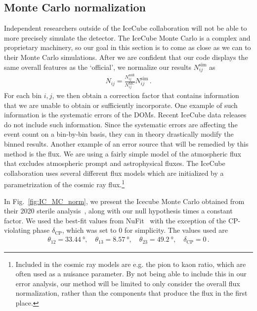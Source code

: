 \subsection*{Monte Carlo normalization}
Independent researchers outside of the IceCube collaboration will not be able to more precisely
simulate the detector. The IceCube Monte Carlo is a complex and proprietary machinery, so our goal in this 
section is to come as close as we can to their Monte Carlo simulations. After we are confident that 
our code displays the same overall features as the `official', we normalize our results $N_{ij}^\text{sim}$ as 
\begin{align}\label{eq:MC_norm}
    N_{ij} = \frac{N_{ij}^\text{null}}{N_{ij}^\text{MC}} N_{ij}^\text{sim}\,.
\end{align}
For each bin $i,j$, we then obtain a correction factor that contains information that we are unable
to obtain or sufficiently incorporate. One example of such information is the systematic errors of the DOMs.
Recent IceCube data releases do not include such information. Since the systematic errors are affecting the 
event count on a bin-by-bin basis, they can in theory drastically modify the binned results. Another example of
an error source that will be remedied by this method is the flux. We are using a fairly simple model of the atmospheric 
flux that excludes atmospheric prompt and astrophysical fluxes. The IceCube collaboration uses several different flux models which are initialized 
by a parametrization of the cosmic ray flux.\footnote{Included in the cosmic ray models are e.g. the pion to kaon 
ratio, which are often used as a nuisance parameter. By not being able to include this in our error analysis, our method will 
be limited to only consider the overall flux normalization, rather than the components that produce the flux in the first place.}

In Fig.~\ref{fig:IC_MC_norm}, we present the Icecube Monte Carlo obtained from their 2020 sterile analysis~\cite{IC2020}, along
with our null hypothesis times a constant factor. 
We used the best-fit values from NuFit~\cite{nufit} with the exception of the CP-violating phase $\delta_\text{CP}$, which was set to $0$ for simplicity. The values used are
\begin{align}\label{eq:nufitparams}
    \theta_{12} = \SI{33.44}{\degree},\hspace{1em} \theta_{13} = \SI{8.57}{\degree},\hspace{1em} \theta_{23} = \SI{49.2}{\degree}, \hspace{1em} \delta_\text{CP} = 0\,.
\end{align}

